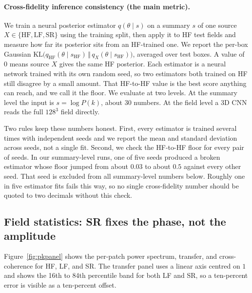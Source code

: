 \documentclass{article} %
\begin{document}
\paragraph{Cross-fidelity inference consistency (the main metric).} We train a
neural posterior estimator $q(\theta\mid s)$ on a summary $s$ of one source
$X\in\{\mathrm{HF},\mathrm{LF},\mathrm{SR}\}$ using the training split, then apply it
to HF test fields and measure how far its posterior sits from an HF-trained one. We
report the per-box Gaussian
$\mathrm{KL}\big(q_\mathrm{HF}(\theta\mid s_\mathrm{HF})\,\Vert\,q_X(\theta\mid s_\mathrm{HF})\big)$,
averaged over test boxes. A value of $0$ means source $X$ gives the same HF
posterior. Each estimator is a neural network trained with its own random seed, so
two estimators both trained on HF still disagree by a small amount. That HF-to-HF
value is the best score anything can reach, and we call it the floor. We evaluate
at two levels. At the summary level the input is $s=\log P(k)$, about $30$ numbers.
At the field level a 3D CNN reads the full $128^3$ field directly.

Two rules keep these numbers honest. First, every estimator is trained several
times with independent seeds and we report the mean and standard deviation across
seeds, not a single fit. Second, we check the HF-to-HF floor for every pair of
seeds. In our summary-level runs, one of five seeds produced a broken estimator
whose floor jumped from about $0.03$ to about $0.5$ against every other seed. That
seed is excluded from all summary-level numbers below. Roughly one in five
estimator fits fails this way, so no single cross-fidelity number should be quoted
to two decimals without this check.

\subsection{Field statistics: SR fixes the phase, not the amplitude}
\label{sec:pk}

Figure~\ref{fig:pkpanel} shows the per-patch power spectrum, transfer, and
cross-coherence for HF, LF, and SR. The transfer panel uses a linear axis centred on
$1$ and shows the 16th to 84th percentile band for both LF and SR, so a
ten-percent error is visible as a ten-percent offset.
\end{document}
